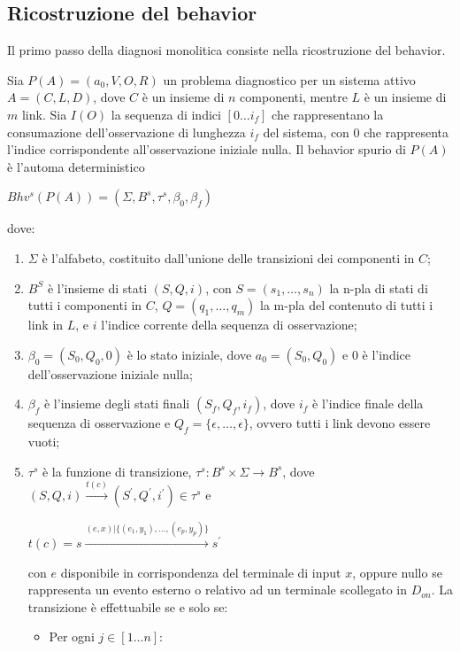 \subsection{Ricostruzione del behavior}
Il primo passo della diagnosi monolitica consiste nella ricostruzione del behavior. 
\begin{defn}
Sia $P(A) = (a_0,V,O,R)$ un problema diagnostico per un sistema attivo $A = (C,L,D)$, dove $C$ è un insieme di $n$ componenti, mentre $L$ è un insieme di $m$ link. Sia $I(O)$ la sequenza di indici $[0 \ldots i_f]$ che rappresentano la consumazione dell'osservazione di lunghezza $i_f$ del sistema, con $0$ che rappresenta l'indice corrispondente all'osservazione iniziale nulla. Il behavior spurio di $P(A)$ è l'automa deterministico
\begin{center}
	$Bhv^s(P(A)) = (\Sigma,B^s,\tau^s,\beta_0,\beta_f)$
\end{center}
dove:
\begin{enumerate}
\item $\Sigma$ è l'alfabeto, costituito dall'unione delle transizioni dei componenti in $C$;
\item $B^S$ è l'insieme di stati $(S,Q,i)$, con $S = (s_1,\ldots,s_n)$ la n-pla di stati di tutti i componenti in $C$, $Q = (q_1,\ldots,q_m)$ la m-pla del contenuto di tutti i link in $L$, e $i$ l'indice corrente della sequenza di osservazione;
\item $\beta_0 = (S_0,Q_0,0)$ è lo stato iniziale, dove $a_0 = (S_0,Q_0)$ e $0$ è l'indice dell'osservazione iniziale nulla;
\item $\beta_f$ è l'insieme degli stati finali $(S_f,Q_f,i_f)$, dove $i_f$ è l'indice finale della sequenza di osservazione e $Q_f = \{\epsilon, \ldots, \epsilon\}$, ovvero tutti i link devono essere vuoti;
\item $\tau^s$ è la funzione di transizione, $\tau^s: B^s \times \Sigma \rightarrow B^s$, dove $(S,Q,i) \xrightarrow{t(c)} (S^\prime,Q^\prime,i^\prime) \in \tau^s$ e 
\begin{center}
	$t(c) = s \xrightarrow{(e,x) | \{(e_1,y_1), \ldots, (e_p,y_p)\}} s^\prime$
\end{center}
con $e$ disponibile in corrispondenza del terminale di input $x$, oppure nullo se rappresenta un evento esterno o relativo ad un terminale scollegato in $D_{on}$. La transizione è effettuabile se e solo se:
\begin{itemize}
\item Per ogni $j \in [1 \ldots n]$:
\begin{center}

\end{center}
\end{itemize}
\end{enumerate}
\end{defn}
